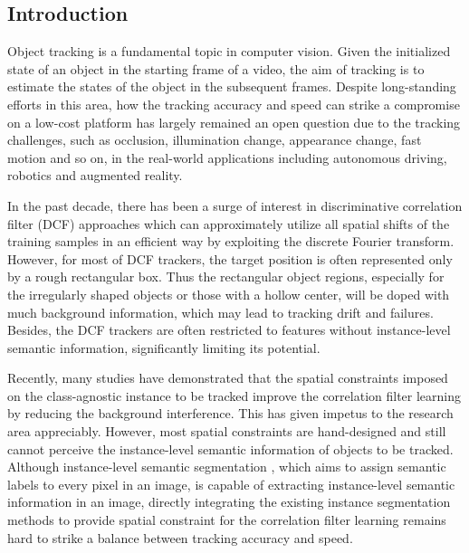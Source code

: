 \documentclass[review]{elsarticle}
\begin{document}
\begin{CJK*}{UTF8}{gbsn}

\section{Introduction}
Object tracking is a fundamental topic in computer vision. Given the initialized state of an object in the starting frame of a video, the aim of tracking is to estimate the states of the object in the subsequent frames. Despite long-standing efforts \cite{Bolme2010VisualOT, Danelljan2014AccurateSE, Henriques2015HighSpeedTW, Li2014ASA, Nam2016LearningMC, Danelljan2015ConvolutionalFF, Wang2018SiamMask} in this area,  how the tracking accuracy and speed can strike a compromise on a low-cost platform  has largely remained an open question due to the tracking challenges, such as occlusion, illumination change, appearance change, fast motion and so on, in the real-world applications including autonomous driving, robotics and augmented reality.

In the past decade, there has been a surge of interest in discriminative correlation filter (DCF) approaches \cite{Bolme2010VisualOT, Danelljan2014AccurateSE, Henriques2015HighSpeedTW, Li2014ASA} which can approximately utilize all spatial shifts of the training samples in an efficient way by exploiting the discrete Fourier transform. However, for most of DCF trackers, the target position is often represented only by a rough rectangular box. Thus the rectangular object regions, especially for the  irregularly shaped objects or those with a hollow center, will be doped with much background information, which may lead to tracking drift and failures. Besides, the DCF trackers are often restricted to features without instance-level semantic information, significantly limiting its potential.

Recently, many studies \cite{Danelljan2015LearningSR, Lukezic2017DiscriminativeCF, Galoogahi2017LearningBC, Xu2018LearningAD, Feng2018LearningSR} have demonstrated that the spatial constraints imposed on the class-agnostic instance to be tracked improve the correlation filter learning by reducing the background interference. This has given impetus to the research area appreciably. However, most spatial constraints are hand-designed and still cannot perceive the instance-level semantic information of objects to be tracked. Although instance-level semantic segmentation \cite{Pinheiro2015LearningTS}, which aims to assign semantic labels to every pixel in an image, is capable of extracting instance-level semantic information in an image, directly integrating the existing instance segmentation methods to provide spatial constraint for the correlation filter learning remains hard to strike a balance between tracking accuracy and speed.


\end{CJK*}
\end{document}

